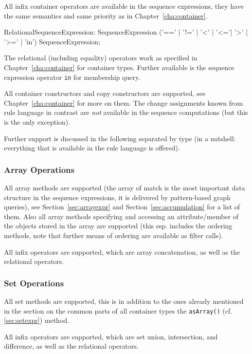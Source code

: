 All infix container operators are available in the sequence expressions, they have the same semantics and same priority as in Chapter~\ref{cha:container}.

\begin{rail}
  RelationalSequenceExpression: 
    SequenceExpression ('==' | '!=' | '<' | '<='| '>' | '>=' | 'in') SequenceExpression;
\end{rail}

The relational (including equality) operators work as specified in Chapter~\ref{cha:container} for container types.
Further available is the sequence expression operator \texttt{in} for membership query.

All container constructors and copy constructors are supported, see Chapter~\ref{cha:container} for more on them.
The change assignments known from rule language in contrast are \emph{not} available in the sequence computations (but this is the only exception).

Further support is discussed in the following separated by type (in a nutshell: everything that is available in the rule language is offered).

\subsubsection*{Array Operations}
All array methods are supported (the array of match is the most important data structure in the sequence expressions, it is delivered by pattern-based graph queries), see Section~\ref{sec:arrayexpr} and Section~\ref{sec:accumulation} for a list of them.
Also all array methods specifying and accessing an attribute/member of the objects stored in the array are supported (this esp. includes the ordering methods, note that further means of ordering are available as filter calls).

All infix operators are supported, which are array concatenation, as well as the relational operators.

\subsubsection*{Set Operations}
All set methods are supported, this is in addition to the ones already mentioned in the section on the common parts of all container types the \texttt{asArray()} (cf. \ref{sec:setexpr}) method.

All infix operators are supported, which are set union, intersection, and difference, as well as the relational operators.

